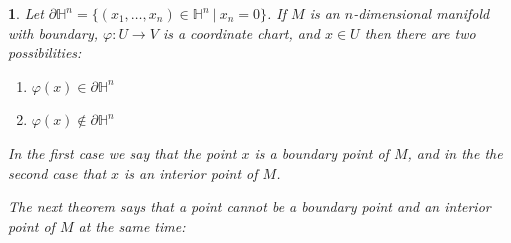 \documentclass[11pt, letterpaper, oneside]{report}
\theoremstyle{pplain}
\newtheorem{ITERMVALUE THM}[theorem]{Intermediate Value Theorem}
\newtheorem{HEINEBOREL THM}[theorem]{Heine-Borel Theorem}
\newtheorem{UMETR THM}[theorem]{Urysohn Metrization Theorem}
\newtheorem{UMETR2 THM}[theorem]{Urysohn Metrization Theorem (v.2)}
\theoremstyle{ddefinition}
\theoremstyle{nnn}
\newtheorem{nn}[theorem]{}
\newtheorem{TDA NN}[theorem]{Topological Data Analysis. }
\theoremstyle{eexercise}
\newcommand{\HH}{{\mathbb H}}
\newcommand{\benu}{\begin{enumerate}}
\newcommand{\eenu}{\end{enumerate}}
\begin{document}
\begin{nn}
Let $\partial \HH^{n} = \{ (x_{1}, \dots, x_{n})\in \HH^{n} \ | \ x_{n} = 0\}$.  If $M$ is an $n$-dimensional 
manifold with boundary,  $\varphi\colon U\to V$ is a coordinate chart, and $x\in U$ then 
there are two possibilities: 
\benu
\item $\varphi(x) \in \partial \HH^{n}$  
\item $\varphi(x) \not\in \partial \HH^{n}$
\eenu

In the first case we say that the point $x$ is a \emph{boundary point} of $M$, and in the
the second case that $x$ is an \emph{interior point} of $M$. 

The next theorem says that a point cannot be a boundary point and an interior point of $M$ at the same time:
\end{nn}
\end{document}
